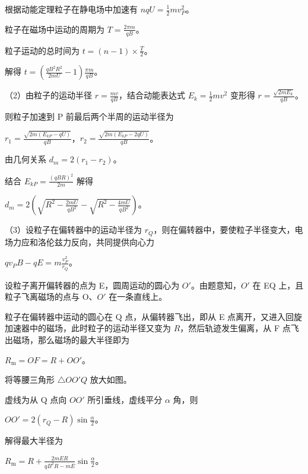 \documentclass[\gkver]{gaokaozhenti}
\begin{document}
\begin{enumerate}
{根据动能定理粒子在静电场中加速有 $nqU=\frac{1}{2}mv_{P}^{2}$。

粒子在磁场中运动的周期为 $T=\frac{2\pi m}{qB}$。

粒子运动的总时间为 $t=(n-1)\times\frac{T}{2}$。

解得 $t=\left(\frac{qB^{2}R^{2}}{2mU}-1\right)\frac{\pi m}{qB}$。

（2）由粒子的运动半径 $r = \frac{mv}{qB}$，结合动能表达式 $E_{k} = \frac{1}{2}mv^{2}$ 变形得 $r = \frac{\sqrt{2mE_{k}}}{qB}$。

则粒子加速到 P 前最后两个半周的运动半径为

$r_{1}=\frac{\sqrt{2m(E_{kP}-qU)}}{qB}$，$r_{2}=\frac{\sqrt{2m(E_{kP}-2qU)}}{qB}$。

由几何关系 $d_{m}=2(r_{1}-r_{2})$。

结合 $E_{kP}=\frac{(qBR)^{2}}{2m}$ 解得

$d_{m}=2\left(\sqrt{R^{2}-\frac{2mU}{qB^{2}}}-\sqrt{R^{2}-\frac{4mU}{qB^{2}}}\right)$。

（3）设粒子在偏转器中的运动半径为 $r_{Q}$，则在偏转器中，要使粒子半径变大，电场力应和洛伦兹力反向，共同提供向心力

$qv_{P}B - qE = m\frac{v_{P}^{2}}{r_{Q}}$。

设粒子离开偏转器的点为 E，圆周运动的圆心为 $O'$。由题意知，$O'$ 在 EQ 上，且粒子飞离磁场的点与 O、$O'$ 在一条直线上。


粒子在偏转器中运动的圆心在 Q 点，从偏转器飞出，即从 E 点离开，又进入回旋加速器中的磁场，此时粒子的运动半径又变为 $R$，然后轨迹发生偏离，从 F 点飞出磁场，那么磁场的最大半径即为

$R_{\mathrm{m}}=OF=R+OO'$。

将等腰三角形 $\triangle OO'Q$ 放大如图。


虚线为从 Q 点向 $OO'$ 所引垂线，虚线平分 $\alpha$ 角，则

$OO'=2(r_{Q}-R)\sin\frac{\alpha}{2}$。

解得最大半径为

$R_{\mathrm{m}}=R+\frac{2mER}{qB^{2}R-mE}\sin\frac{\alpha}{2}$。
}

\end{enumerate}
\end{document}
